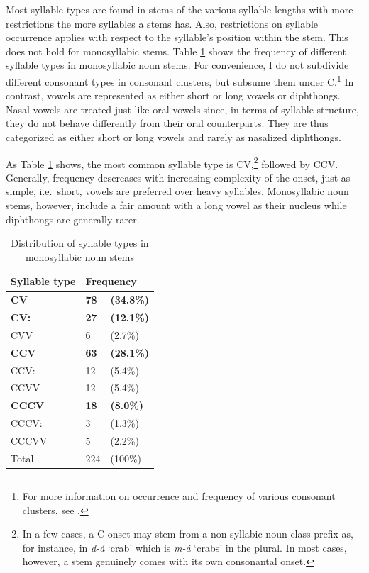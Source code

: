 Most syllable types are found in stems of the various syllable lengths with more restrictions the more syllables a stems has. Also, restrictions on syllable occurrence applies with respect to the syllable's position within the stem. This does not hold for monosyllabic stems. Table \ref{Tab:o1Syll} shows the frequency of different syllable types in monosyllabic noun stems. For convenience, I do not subdivide different consonant types in consonant clusters, but subsume them under C.\footnote{For more information on occurrence and frequency of various consonant clusters, see .} In contrast, vowels are represented as either short or long vowels or diphthongs. Nasal vowels are treated just like oral vowels since, in terms of syllable structure, they do not behave differently from their oral counterparts. They are thus categorized as either short or long vowels and rarely as nasalized diphthongs.

As Table \ref{Tab:o1Syll} shows, the most common syllable type is CV,\footnote{In a few cases, a C onset may stem from a non-syllabic noun class prefix as, for instance, in {\itshape d-á} `crab' which is {\itshape m-á} `crabs' in the plural. In most cases, however, a stem genuinely comes with its own consonantal onset.} followed by CCV. Generally, frequency descreases with increasing complexity of the onset, just as simple, i.e.\ short, vowels are preferred over heavy syllables. 
 Monosyllabic noun stems, however, include a fair amount with a long vowel as their nucleus while diphthongs are generally rarer.  



\begin{table} 
\centering
\begin{tabular}{lll}
Syllable type & \multicolumn{2}{l}{Frequency} \\  \midrule
{\bfseries CV}	&	{\bfseries 78} & {\bfseries (34.8\%)} \\
{\bfseries CV:} 	& 	{\bfseries 27}  & {\bfseries (12.1\%)} \\
CVV 	& 	6  & (2.7\%) \\ \hdashline[0.5pt/5pt]

{\bfseries CCV} 	& 	{\bfseries 63} & {\bfseries (28.1\%)}  \\ 
CCV: & 	12 & (5.4\%)  \\
CCVV & 	12 & (5.4\%) \\ \hdashline[0.5pt/5pt]
		
{\bfseries CCCV} & 	{\bfseries 18} & {\bfseries (8.0\%)} \\ 
CCCV: & 	3 & (1.3\%) \\
CCCVV & 	5 & (2.2\%) \\  \midrule

Total & 224 & (100\%) \\
\end{tabular}
\caption{Distribution of syllable types in monosyllabic noun stems}
\label{Tab:o1Syll}
\end{table} 
		
